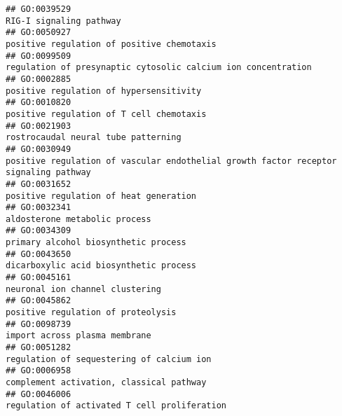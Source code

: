 \documentclass[
]{article}
\begin{document}
\begin{verbatim}
## GO:0039529                                                                                                                          RIG-I signaling pathway
## GO:0050927                                                                                                       positive regulation of positive chemotaxis
## GO:0099509                                                                                    regulation of presynaptic cytosolic calcium ion concentration
## GO:0002885                                                                                                          positive regulation of hypersensitivity
## GO:0010820                                                                                                         positive regulation of T cell chemotaxis
## GO:0021903                                                                                                              rostrocaudal neural tube patterning
## GO:0030949                                                             positive regulation of vascular endothelial growth factor receptor signaling pathway
## GO:0031652                                                                                                           positive regulation of heat generation
## GO:0032341                                                                                                                    aldosterone metabolic process
## GO:0034309                                                                                                             primary alcohol biosynthetic process
## GO:0043650                                                                                                           dicarboxylic acid biosynthetic process
## GO:0045161                                                                                                                  neuronal ion channel clustering
## GO:0045862                                                                                                               positive regulation of proteolysis
## GO:0098739                                                                                                                    import across plasma membrane
## GO:0051282                                                                                                        regulation of sequestering of calcium ion
## GO:0006958                                                                                                         complement activation, classical pathway
## GO:0046006                                                                                                     regulation of activated T cell proliferation

\end{verbatim}
\end{document}

